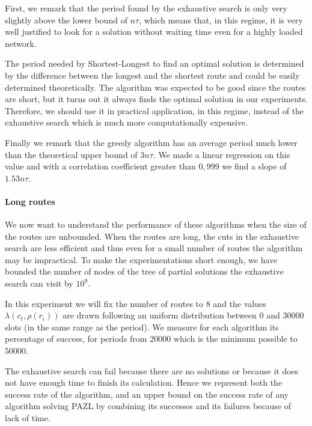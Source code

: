 \documentclass[a4paper,10pt]{article}
\begin{document}
      First, we remark that the period found by the exhaustive search is only very slightly above the lower bound of 
      $n\tau$, which means that, in this regime, it is very well justified to look for a solution without waiting time even for a highly loaded network. 
      
      The period needed by Shortest-Longest to find an optimal solution is determined by the difference between the longest and the shortest route and could be easily determined theoretically. The algorithm was expected to be good since the routes are short, but it turns out it always finds the optimal solution in our experiments. Therefore, we should use it in practical application, in this regime, instead of the exhaustive search which is much more computationally expensive. 
      
      Finally we remark that the greedy algorithm has an average period much lower than the theoretical upper bound of $3n\tau$. We made a linear regression on this value and with a correlation coefficient greater than $0,999$ we find a slope of $1.53n\tau$.
      
      

      \paragraph{Long routes}
      
      We now want to understand the performance of these algorithms when the size of the routes are unbounded. When the routes are long, the cuts in the exhaustive search are less efficient and thus even for a small number of routes the algorithm may be impractical. To make the experimentations short enough, we have bounded the number of nodes of the tree of partial solutions the exhaustive search can visit by $10^9$.
      
      In this experiment we will fix the number of routes to $8$ and the values $\lambda(c_t,\rho(r_{i}))$ are drawn following an uniform distribution between $0$ and $30000$ slots (in the same range as the period).
      We measure for each algorithm its percentage of success, for periods from $20000$ which is the minimum possible to $50000$.
      
      The exhaustive search can fail because there are no solutions or because it does not have enough time to finish its calculation. Hence we represent both the success rate of the algorithm, and an upper bound on the success rate of any algorithm solving PAZL by combining its successes and its failures because of lack of time. 
      
\end{document}
